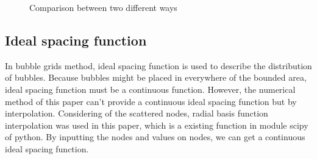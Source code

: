 \documentclass[a4paper, 11pt, final]{article}
\begin{document}
\begin{figure}[htbp]
    \centering
    \caption{Comparison between two different ways}
\end{figure}



\subsection{Ideal spacing function}
In bubble grids method, ideal spacing function is used to describe the
distribution of bubbles.
Because bubbles might be placed in everywhere of the bounded area,
ideal spacing function must be a continuous function\cite{12,13}.
However, the numerical method of this paper can't provide a continuous
ideal spacing function but by interpolation.
Considering of the scattered nodes, radial basis function
interpolation was used in this paper,
which is a existing function in module scipy of python.
By inputting the nodes and values on nodes,
we can get a continuous ideal spacing function.
\end{document}
